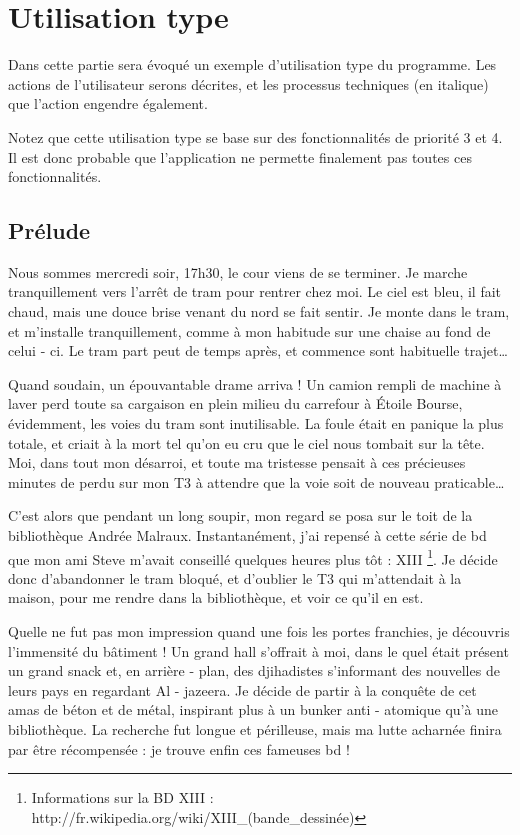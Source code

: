 \section{Utilisation type}
Dans cette partie sera évoqué un exemple d'utilisation type du programme.
Les actions de l'utilisateur serons décrites, et les processus techniques (en italique) que l'action engendre également. 

Notez que cette utilisation type se base sur des fonctionnalités de priorité 3 et 4.
Il est donc probable que l'application ne permette finalement pas toutes ces fonctionnalités. 

\subsection{Prélude}
Nous sommes mercredi soir, 17h30, le cour viens de se terminer. 
Je marche tranquillement vers l'arrêt de tram pour rentrer chez moi.
Le ciel est bleu, il fait chaud, mais une douce brise venant du nord se fait sentir. 
Je monte dans le tram, et m'installe tranquillement, comme à mon habitude sur une chaise au fond de celui - ci. 
Le tram part peut de temps après, et commence sont habituelle trajet…

Quand soudain, un épouvantable drame arriva ! 
Un camion rempli de machine à laver perd toute sa cargaison en plein milieu du carrefour à Étoile Bourse, évidemment, les voies du tram sont inutilisable. 
La foule était en panique la plus totale, et criait à la mort tel qu'on eu cru que le ciel nous tombait sur la tête. 
Moi, dans tout mon désarroi, et toute ma tristesse pensait à ces précieuses minutes de perdu sur mon T3 à attendre que la voie soit de nouveau praticable…

C'est alors que pendant un long soupir, mon regard se posa sur le toit de la bibliothèque Andrée Malraux. 
Instantanément, j'ai repensé à cette série de bd que mon ami Steve m'avait conseillé quelques heures plus tôt : XIII
\footnote{Informations sur la BD XIII : http://fr.wikipedia.org/wiki/XIII\_(bande\_dessinée)}. 
Je décide donc d'abandonner le tram bloqué, et d'oublier le T3 qui m'attendait à la maison, pour me rendre dans la bibliothèque, et voir ce qu'il en est. 

Quelle ne fut pas mon impression quand une fois les portes franchies, je découvris l'immensité du bâtiment !
Un grand hall s'offrait à moi, dans le quel était présent un grand snack et, en arrière - plan, des djihadistes s'informant des nouvelles de leurs pays en regardant Al - jazeera. 
Je décide de partir à la conquête de cet amas de béton et de métal, inspirant plus à un bunker anti - atomique qu'à une bibliothèque. 
La recherche fut longue et périlleuse, mais ma lutte acharnée finira par être récompensée : je trouve enfin ces fameuses bd !

